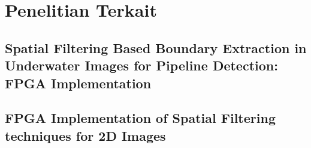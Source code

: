 






\section{Penelitian Terkait}
\subsection{Spatial Filtering Based Boundary Extraction in Underwater Images for Pipeline Detection: FPGA Implementation}

\subsection{FPGA Implementation of Spatial Filtering techniques for 2D Images}

